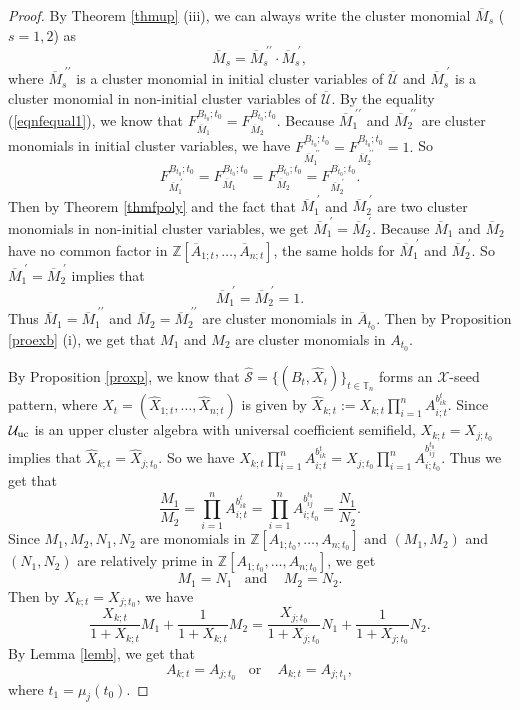 \documentclass{amsart}
\theoremstyle{definition}
\theoremstyle{remark}
\numberwithin{equation}{section}
\begin{document}
\begin{proof}
By Theorem \ref{thmup} (iii), we  can always write the cluster monomial $\overline M_s$ ($s=1,2$) as $$\overline M_s=\overline M_s^{\;\prime\prime}\cdot \overline M_s^{\;\prime},$$
where $\overline M_s^{\;\prime\prime}$ is a cluster monomial in initial cluster variables of $\overline{\mathcal U}$ and $\overline M_s^{\;\prime}$ is a cluster monomial in non-initial cluster variables of $\overline{\mathcal U}$. By the equality (\ref{eqnfequal1}), we know that $F_{\overline M_1}^{B_{t_0};t_0}=F_{\overline M_2}^{B_{t_0};t_0}$. Because $\overline M_1^{\;\prime\prime}$ and $\overline M_2^{\;\prime\prime}$ are cluster monomials in initial cluster variables, we have $F_{\overline M_1^{\;\prime\prime}}^{B_{t_0};t_0}=F_{\overline M_2^{\;\prime\prime}}^{B_{t_0};t_0}=1.$
So  $$F_{\overline M_1^{\;\prime}}^{B_{t_0};t_0}=F_{\overline M_1}^{B_{t_0};t_0}=F_{\overline M_2}^{B_{t_0};t_0}=F_{\overline M_2^{\;\prime}}^{B_{t_0};t_0}.$$
Then by Theorem \ref{thmfpoly} and the fact that $\overline M_1^{\;\prime}$ and  $\overline M_2^{\;\prime}$ are two cluster monomials in non-initial cluster variables, we get $\overline M_1^{\;\prime}=\overline M_2^{\;\prime}$. Because $\overline M_1$ and $\overline M_2$ have no common factor in $\mathbb Z[\overline A_{1;t},\ldots,\overline A_{n;t}]$, the same holds for $\overline M_1^{\;\prime}$ and $\overline M_2^{\;\prime}$. So $\overline M_1^{\;\prime}=\overline M_2^{\;\prime}$ implies that  $$\overline M_1^{\;\prime}=\overline M_2^{\;\prime}=1.$$
Thus $\overline M_1=\overline M_1^{\;\prime\prime}$ and $\overline M_2=\overline M_2^{\;\prime\prime}$ are cluster monomials in $\overline A_{t_0}$. Then by Proposition \ref{proexb} (i), we get that  $M_1$ and $M_2$ are cluster monomials in $A_{t_0}$.



By Proposition \ref{proxp}, we know that $\widehat {\mathcal S}=\{(B_{t},\widehat X_{t})\}_{t\in\mathbb T_n}$ forms an $\mathscr X$-seed pattern, where $\widehat X_t=(\widehat X_{1;t},\ldots,\widehat X_{n;t})$ is given by $\widehat X_{k; t}:=X_{k;t}\prod\limits_{i=1}^nA_{i;t}^{b_{ik}^{t}}$. Since $\mathcal U_{\rm uc}$ is an upper cluster algebra with universal coefficient semifield, $X_{k;t}=X_{j;t_0}$ implies that $\widehat X_{k;t}=\widehat X_{j;t_0}$. So we have $X_{k;t}\prod\limits_{i=1}^nA_{i;t}^{b_{ik}^{t}}=X_{j;t_0}\prod\limits_{i=1}^nA_{i;t_0}^{b_{ij}^{t_0}}$. Thus we get that
$$\frac{M_1}{M_2}=\prod\limits_{i=1}^nA_{i;t}^{b_{ik}^{t}}=\prod\limits_{i=1}^nA_{i;t_0}^{b_{ij}^{t_0}}=\frac{N_1}{N_2}.$$
Since $M_1,M_2,N_1,N_2$ are monomials in $\mathbb Z[A_{1;t_0},\ldots,A_{n;t_0}]$ and $(M_1,M_2)$ and $(N_1,N_2)$ are relatively prime in $\mathbb Z[A_{1;t_0},\ldots,A_{n;t_0}]$, we get $$M_1=N_1\;\;\text{ and }\;\;\;M_2=N_2.$$  Then by $X_{k;t}=X_{j;t_0}$, we have $$\frac{X_{k;t}}{1+X_{k;t}}M_1+\frac{1}{1+X_{k;t}}M_2=\frac{X_{j;t_0}}{1+X_{j;t_0}}N_1+\frac{1}{1+X_{j;t_0}}N_2.$$
By Lemma \ref{lemb}, we get that  $$A_{k;t}=A_{j;t_0}\;\;\text{ or }\;\;\;A_{k;t}=A_{j;t_1},$$
where $t_1=\mu_j(t_0)$.






\end{proof}
\end{document}
